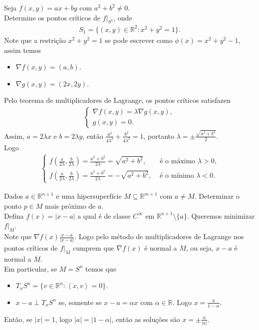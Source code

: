 \begin{example}
  Seja $f(x,y)=ax+by$ com $a^{2}+b^{2}\neq 0$.\\
  Determine os pontos críticos de $f\big|_{S^{1}}$, onde
  \begin{align*}
    S_1=\{(x,y)\in\mathbb{R}^{2}:x^{2}+y^{2}=1\}.
  \end{align*}
  Note que a restrição $x^{2}+y^{2}=1$ se pode escrever como $\phi(x)=x^{2}+y^{2}-1$, assim temos
  \begin{itemize}
    \item $\nabla f(x,y)=(a,b)$.
    \item $\nabla g(x,y)=(2x,2y)$.
  \end{itemize}
  Pelo teorema de multiplicadores de Lagrange, os pontos críticos satisfazen
  \begin{align*}
    \begin{cases}
      \nabla f(x,y)=\lambda \nabla g(x,y), \\
      g(x,y)=0.
    \end{cases}
  \end{align*}
  Assim, $a=2\lambda x$ e $b=2\lambda y$, então $\displaystyle \frac{a^{2}}{4\lambda^{2}}+\frac{b^{2}}{4\lambda^{2}}=1$, portanto $\lambda=\pm\frac{\sqrt{a^{2}+b^{2}}}{2}$.\\
  Logo
  \begin{align*}
    \begin{cases}
      f\left( \frac{a}{2\lambda},\frac{b}{2\lambda} \right)=\frac{a^{2}+b^{2}}{2\lambda}=\sqrt{a^{2}+b^{2}}, &\text{ é o máximo } \lambda>0 \text{,} \\
      f\left( \frac{a}{2\lambda},\frac{b}{2\lambda} \right)=\frac{a^{2}+b^{2}}{2\lambda}=-\sqrt{a^{2}+b^{2}}, &\text{ é o mínimo } \lambda<0.
    \end{cases} 
  \end{align*}
\end{example}
\begin{example}
  Dados $a\in \mathbb{R}^{n+1}$ e uma hipersuperfície $M\subseteq \mathbb{R}^{m+1}$ com $a\neq M$. Determinar o ponto $p\in M$ mais próximo de $a$.\\
  Defina $f(x)=|x-a|$ a qual é de classe $C^{\infty}$ em $\mathbb{R}^{n+1}\setminus\{a\}$. Queremos minimizar $f\big|_{M}$.\\
  Note que $\nabla f(x)\frac{x-a}{|x-a|}$. Logo pelo método de multiplicadores de Lagrange nos pontos críticos de $f\big|_{M}$ cumprem que $\nabla f(x)$ é normal a $M$, ou seja, $x-a$ é normal a $M$.\\
  Em particular, se $M=S^{n}$ temos que
  \begin{itemize}
    \item $T_{x}S^{n}=\{v\in\mathbb{R}^{n}: \left\langle x,v \right\rangle=0\}$.
    \item $x-a\perp T_{x}S^{n}$ se, somente se $x-a=\alpha x$ com $\alpha\in\mathbb{R}$. Logo $x=\frac{a}{1-\alpha}$. 
  \end{itemize}
  Então, se $|x|=1$, logo $|a|=|1-\alpha|$, então as soluções são $x=\pm\frac{a}{|a|}$.
\end{example}
